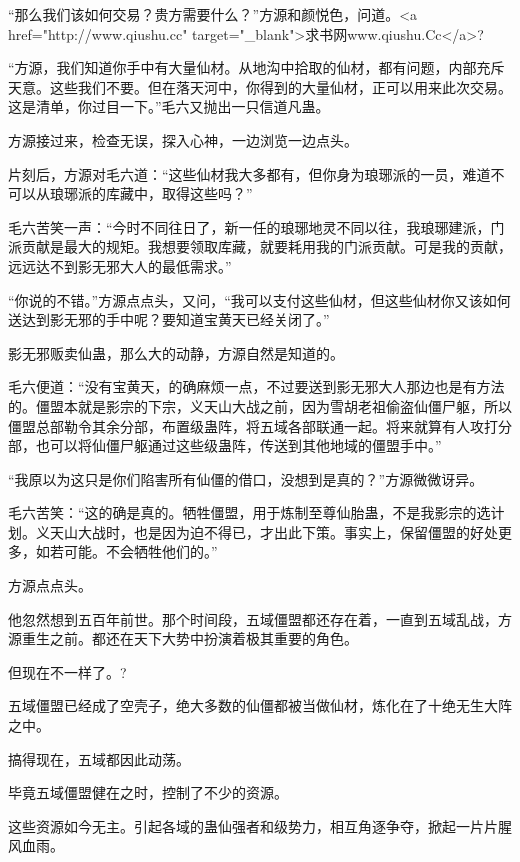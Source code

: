 
\begin{this_body}

“那么我们该如何交易？贵方需要什么？”方源和颜悦色，问道。<a href="http://www.qiushu.cc" target="\_blank">求书网www.qiushu.Cc</a>?

“方源，我们知道你手中有大量仙材。从地沟中拾取的仙材，都有问题，内部充斥天意。这些我们不要。但在落天河中，你得到的大量仙材，正可以用来此次交易。这是清单，你过目一下。”毛六又抛出一只信道凡蛊。

方源接过来，检查无误，探入心神，一边浏览一边点头。

片刻后，方源对毛六道：“这些仙材我大多都有，但你身为琅琊派的一员，难道不可以从琅琊派的库藏中，取得这些吗？”

毛六苦笑一声：“今时不同往日了，新一任的琅琊地灵不同以往，我琅琊建派，门派贡献是最大的规矩。我想要领取库藏，就要耗用我的门派贡献。可是我的贡献，远远达不到影无邪大人的最低需求。”

“你说的不错。”方源点点头，又问，“我可以支付这些仙材，但这些仙材你又该如何送达到影无邪的手中呢？要知道宝黄天已经关闭了。”

影无邪贩卖仙蛊，那么大的动静，方源自然是知道的。

毛六便道：“没有宝黄天，的确麻烦一点，不过要送到影无邪大人那边也是有方法的。僵盟本就是影宗的下宗，义天山大战之前，因为雪胡老祖偷盗仙僵尸躯，所以僵盟总部勒令其余分部，布置级蛊阵，将五域各部联通一起。将来就算有人攻打分部，也可以将仙僵尸躯通过这些级蛊阵，传送到其他地域的僵盟手中。”

“我原以为这只是你们陷害所有仙僵的借口，没想到是真的？”方源微微讶异。

毛六苦笑：“这的确是真的。牺牲僵盟，用于炼制至尊仙胎蛊，不是我影宗的选计划。义天山大战时，也是因为迫不得已，才出此下策。事实上，保留僵盟的好处更多，如若可能。不会牺牲他们的。”

方源点点头。

他忽然想到五百年前世。那个时间段，五域僵盟都还存在着，一直到五域乱战，方源重生之前。都还在天下大势中扮演着极其重要的角色。

但现在不一样了。?

五域僵盟已经成了空壳子，绝大多数的仙僵都被当做仙材，炼化在了十绝无生大阵之中。

搞得现在，五域都因此动荡。

毕竟五域僵盟健在之时，控制了不少的资源。

这些资源如今无主。引起各域的蛊仙强者和级势力，相互角逐争夺，掀起一片片腥风血雨。


\end{this_body}
